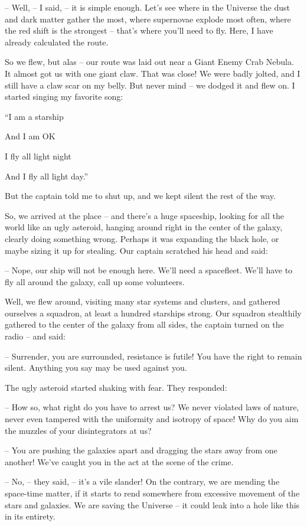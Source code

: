 \documentclass[ebook,oneside,final,openright]{memoir}
\begin{document}
– Well, – I said, – it is simple enough. Let’s see where in the Universe the dust and dark matter gather the most, where supernovae explode most often, where the red shift is the strongest – that’s where you’ll need to fly. Here, I have already calculated the route.\par
So we flew, but alas – our route was laid out near a Giant Enemy Crab Nebula. It almost got us with one giant claw. That was close! We were badly jolted, and I still have a claw scar on my belly. But never mind – we dodged it and flew on. I started singing my favorite song: \par
“I am a starship \par
 And I am OK \par
 I fly all light night \par
 And I fly all light day.”\par
 But the captain told me to shut up, and we kept silent the rest of the way.\par
\par
So, we arrived at the place – and there’s a huge spaceship, looking for all the world like an ugly asteroid, hanging around right in the center of the galaxy, clearly doing something wrong. Perhaps it was expanding the black hole, or maybe sizing it up for stealing. Our captain scratched his head and said:\par
– Nope, our ship will not be enough here. We’ll need a spacefleet. We’ll have to fly all around the galaxy, call up some volunteers.\par
Well, we flew around, visiting many star systems and clusters, and gathered ourselves a squadron, at least a hundred starships strong. Our squadron stealthily gathered to the center of the galaxy from all sides, the captain turned on the radio – and said:\par
– Surrender, you are surrounded, resistance is futile! You have the right to remain silent. Anything you say may be used against you.\par
The ugly asteroid started shaking with fear. They responded:\par
– How so, what right do you have to arrest us? We never violated laws of nature, never even tampered with the uniformity and isotropy of space! Why do you aim the muzzles of your disintegrators at us?\par
– You are pushing the galaxies apart and dragging the stars away from one another! We’ve caught you in the act at the scene of the crime.\par
– No, – they said, – it’s a vile slander! On the contrary, we are mending the space-time matter, if it starts to rend somewhere from excessive movement of the stars and galaxies. We are saving the Universe – it could leak into a hole like this in its entirety.\par
\end{document}
